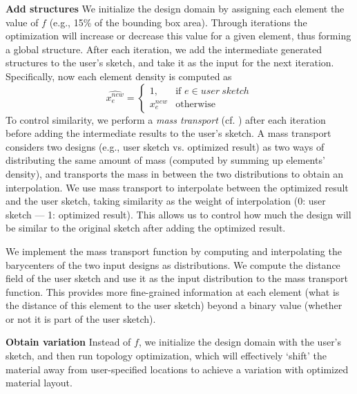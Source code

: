\textbf{Add structures} \hspace{0.1cm}
We initialize the design domain by assigning each element the value of $f$
(e.g., 15\% of the bounding box area). Through iterations the optimization will increase or decrease this value for a given element, thus forming a global structure. After each iteration, we add the intermediate generated structures to the user's sketch, and take it as the input for the next iteration. Specifically, now each element density is computed as
\begin{equation}
    \widehat {x_e^{new}}= 
\begin{cases}
    1,          & \text{if } e \in user~sketch\\
    x_e^{new}	& \text{otherwise}
\end{cases}
\end{equation}
To control similarity, we perform a \textit{mass transport} (cf. \cite{bonneel2011displacement}) after each iteration before adding the intermediate results to the user's sketch. A mass transport considers two designs (e.g., user sketch vs. optimized result) as two ways of distributing the same amount of mass (computed by summing up elements' density), and transports the mass in between the two distributions to obtain an interpolation. We use mass transport to interpolate between the optimized result and the user sketch, taking similarity as the weight of interpolation (0: user sketch --- 1: optimized result). This allows us to control how much the design will be similar to the original sketch after adding the optimized result.

We implement the mass transport function by computing and interpolating the barycenters of the two input designs as distributions. We compute the distance field of the user sketch and use it as the input distribution to the mass transport function. This provides more fine-grained information at each element (what is the distance of this element to the user sketch) beyond a binary value (whether or not it is part of the user sketch).

\textbf{Obtain variation} \hspace{0.1cm}
Instead of $f$, we initialize the design domain with the user's sketch, and then run topology optimization, which will effectively `shift' the material away from user-specified locations to achieve a variation with optimized material layout.

